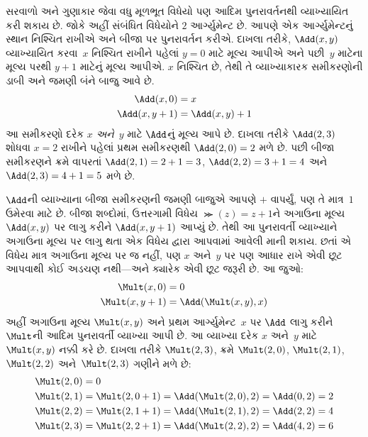 \documentclass[../../../include/open-logic-section]{subfiles}
\begin{document}
સરવાળો અને ગુણાકાર જેવા વધુ મૂળભૂત વિધેયો પણ આદિમ પુનરાવર્તનથી
વ્યાખ્યાયિત કરી શકાય છે. જોકે અહીં સંબંધિત વિધેયોને $2$ આર્ગ્યુમેન્ટ
છે. આપણે એક આર્ગ્યુમેન્ટનું સ્થાન નિશ્ચિત રાખીએ અને બીજા પર
પુનરાવર્તન કરીએ. દાખલા તરીકે, $\Add(x, y)$ વ્યાખ્યાયિત કરવા~$x$
નિશ્ચિત રાખીને પહેલાં $y=0$ માટે મૂલ્ય આપીએ અને પછી~$y$ માટેના
મૂલ્ય પરથી $y+1$ માટેનું મૂલ્ય આપીએ. $x$ નિશ્ચિત છે, તેથી તે
વ્યાખ્યાકારક સમીકરણોની ડાબી અને જમણી બંને બાજુ આવે છે.
\begin{align*}
\Add(x,0) & =  x\\
\Add(x,y+1) & =  \Add(x,y)+1
\end{align*}
આ સમીકરણો દરેક $x$ \emph{અને}~$y$ માટે $\Add$નું મૂલ્ય આપે છે.
દાખલા તરીકે $\Add(2,3)$ શોધવા $x = 2$ રાખીને પહેલાં પ્રથમ સમીકરણથી
$\Add(2,0) = 2$ મળે છે. પછી બીજા સમીકરણને ક્રમે વાપરતાં
$\Add(2,1) = 2 + 1 = 3$, $\Add(2, 2) = 3 + 1 = 4$ અને $\Add(2,
3) = 4 + 1 = 5$ મળે છે.

$\Add$ની વ્યાખ્યાના બીજા સમીકરણની જમણી બાજુએ આપણે $+$ વાપર્યું,
પણ તે માત્ર~$1$ ઉમેરવા માટે છે. બીજા શબ્દોમાં, ઉત્તરગામી વિધેય
$\Succ(z) = z+1$ને અગાઉના મૂલ્ય $\Add(x,y)$ પર લાગુ કરીને
$\Add(x,y+1)$ આપ્યું છે. તેથી આ પુનરાવર્તી વ્યાખ્યાને અગાઉના
મૂલ્ય પર લાગુ થતા એક વિધેય દ્વારા આપવામાં આવેલી માની શકાય. છતાં
એ વિધેય માત્ર અગાઉના મૂલ્ય પર જ નહીં, પણ $x$ અને~$y$ પર પણ આધાર
રાખે એવી છૂટ આપવાથી કોઈ અડચણ નથી---અને ક્યારેક એવી છૂટ જરૂરી છે.
આ જુઓ:
\begin{align*}
  \Mult(x,0) & =  0 \\
  \Mult(x,y+1) & =  \Add(\Mult(x,y),x)
\end{align*}
અહીં અગાઉના મૂલ્ય $\Mult(x,y)$ અને પ્રથમ આર્ગ્યુમેન્ટ~$x$ પર
$\Add$ લાગુ કરીને $\Mult$ની આદિમ પુનરાવર્તી વ્યાખ્યા આપી છે.
આ વ્યાખ્યા દરેક $x$ અને~$y$ માટે $\Mult(x,y)$ નક્કી કરે છે.
દાખલા તરીકે $\Mult(2,3)$, ક્રમે $\Mult(2,0)$, $\Mult(2,1)$,
$\Mult(2,2)$ અને~$\Mult(2,3)$ ગણીને મળે છે:
\begin{align*}
  \Mult(2,0) & = 0\\
  \Mult(2,1) & = \Mult(2,0+1) =
  \Add(\Mult(2,0), 2) = \Add(0, 2) = 2\\
  \Mult(2,2) & = \Mult(2,1+1) =
  \Add(\Mult(2,1), 2) = \Add(2, 2) = 4\\
  \Mult(2,3) & = \Mult(2,2+1) =
  \Add(\Mult(2,2), 2) = \Add(4, 2) = 6
\end{align*}
\end{document}
